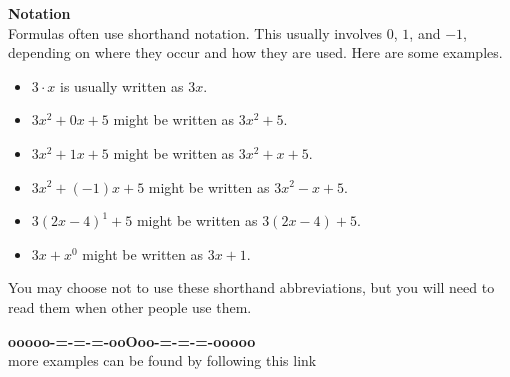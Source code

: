 \documentclass{ximera}
\begin{document}
\begin{warning} \textbf{\textcolor{red!70!darkgray}{Notation}}  \\


Formulas often use shorthand notation.  This usually involves $0$, $1$, and $-1$, depending on where they occur and how they are used.  Here are some examples.


\begin{itemize}
\item $3 \cdot x$ is usually written as $3x$.
\item $3x^2 + 0 x + 5$  might be written as $3x^2 + 5$.
\item $3x^2 + 1 x + 5$  might be written as $3x^2 + x + 5$.
\item $3x^2 + (-1) x + 5$  might be written as $3x^2 - x + 5$.
\item $3(2x-4)^1 + 5$  might be written as $3(2x-4) + 5$.
\item $3x + x^0$  might be written as $3x + 1$.
\end{itemize}


You may choose not to use these shorthand abbreviations, but you will need to read them when other people use them.

\end{warning}
















\begin{onlineOnly}
\begin{center}
\textbf{\textcolor{green!50!black}{ooooo-=-=-=-ooOoo-=-=-=-ooooo}} \\

more examples can be found by following this link\\ 

\end{center}
\end{onlineOnly}
\end{document}
